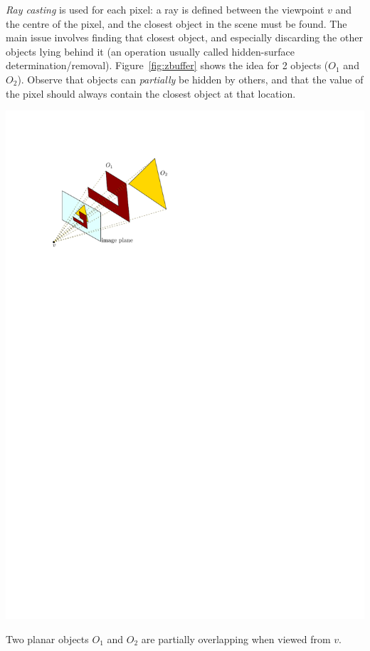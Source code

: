 \emph{Ray casting} is used for each pixel: a ray is defined between the viewpoint $v$ and the centre of the pixel, and the closest object in the scene must be found.%
The main issue involves finding that closest object, and especially discarding the other objects lying behind it (an operation usually called hidden-surface determination/removal).%
Figure~\ref{fig:zbuffer} shows the idea for 2 objects ($O_1$ and $O_2$).
Observe that objects can \emph{partially} be hidden by others, and that the value of the pixel should always contain the closest object at that location.
\begin{marginfigure}
  \centering
  \includegraphics[width=\linewidth]{zbuffer.pdf}
  \caption{Two planar objects $O_1$ and $O_2$ are partially overlapping when viewed from $v$.}%
  \label{fig:zbuffer}
\end{marginfigure}

